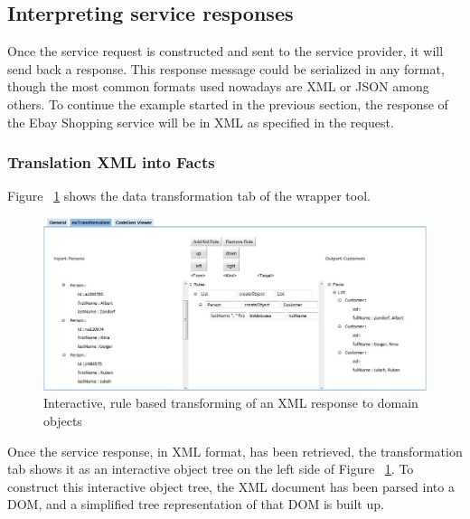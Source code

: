 

\subsection{Interpreting service responses} %
\label{sub:interpreting_service_responses}

Once the service request is constructed and sent to the service provider, it will send back a response. This response message could be serialized in any format, though the most common formats used nowadays are XML or JSON among others. To continue the example started in the previous section, the response of the Ebay Shopping service will be in XML as specified in the request.

\subsubsection{Translation XML into Facts} %
\label{ssub:translation_xml_into_facts}

Figure ~\ref{fig:response_service_execution} shows the data transformation tab of the wrapper tool. 

\begin{figure}
  \begin{center}
    \includegraphics[width=\linewidth]{images/ServiceWrapperToolGVSWithTransformationRules.png}
    \caption{Interactive, rule based transforming of an XML response to domain objects}
    \label{fig:response_service_execution}
  \end{center}
\end{figure}

Once the service response, in XML format, has been retrieved, the transformation tab shows it as an interactive object tree on the left side of Figure ~\ref{fig:response_service_execution}. To construct this interactive object tree, the XML document has been parsed into a DOM, and a simplified tree representation of that DOM is built up. 

